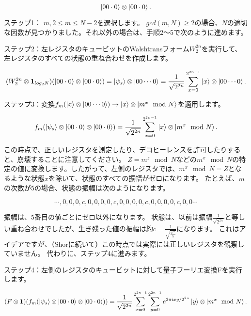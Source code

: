 \begin{equation}
\label{108}
\ket{00 \cdot 0} \otimes \ket{00 \cdot 0}.
\end{equation}

ステップ1： $m, 2 \le  m \le N-2$を選択します。 $gcd(m,N) \ge 2$の場合、$N$の適切な因数が見つかりました。それ以外の場合は、手順2〜5で次のように進めます。

ステップ2：左レジスタのキュービットのWalshtransフォーム$W_2^{2n}$を実行して、左レジスタのすべての状態の重ね合わせを作成します。

\begin{equation}
\label{109}
( W_2^{2n} \otimes \mathbf{1}_{log_2 N} )
( \ket{00 \cdot 0} \otimes \ket{00 \cdot 0} )
=
\ket{\psi_s} \otimes \ket{00 \cdots 0}
=
\frac{1}{\sqrt{2^{2n}}}
\sum_{x=0}^{2^{2n-1}}
\ket{x} \otimes \ket{00 \cdots 0}.
\end{equation}

ステップ3：変換$f_m( \ket{x} \otimes \ket{00 \cdots 0}) \to \ket{x} \otimes \ket{m^x \mod N} $を適用します。

\begin{equation}
\label{110}
f_m ( \ket{\psi_s} \otimes  \ket{00 \cdot 0} \otimes \ket{00 \cdot 0} )
=
\frac{1}{\sqrt{2^{2n}}}
\sum_{x=0}^{2^{2n-1}}
\ket{x} \otimes \ket{m^x \mod N}.
\end{equation}

この時点で、正しいレジスタを測定したり、デコヒーレンスを許可したりすると、崩壊することに注意してください。
$Z = m^z \mod N$などの$m^x \mod N$の特定の値に変換します。したがって、左側のレジスタでは、$m^x \mod N = Z$となるような状態$x$を除いて、状態のすべての振幅がゼロになります。
たとえば、$m$の次数が$5$の場合、状態の振幅は次のようになります。
  
\begin{equation}
\label{111}
\cdots ,0,0,0,c,0,0,0,0,c,0,0,0,0,c,0,0,0,0,c,0,0 \cdots
\end{equation}

振幅は、5番目の値ごとにゼロ以外になります。 状態は、以前は振幅$\frac{1}{\sqrt{2^{2n}}} $と等しい重ね合わせでしたが、生き残った値の振幅は約$c = \frac{1}{\sqrt{\frac{2^{2n}}{5}}} $になります。
これはアイデアですが、（Shorに続いて）この時点では実際には正しいレジスタを観察していません。 代わりに、ステップ4に進みます。

ステップ4：左側のレジスタのキュービットに対して量子フーリエ変換Fを実行します。

\begin{equation}
\label{112}
(F \otimes \mathbf{1} )(f_m ( \ket{\psi_s} \otimes  \ket{00 \cdot 0} \otimes \ket{00 \cdot 0} ))
=
\frac{1}{\sqrt{2^{2n}}}
\sum_{x=0}^{2^{2n-1}}
\sum_{y=0}^{2^{2n-1}}
e^{2 \pi i xy / 2^{2n}}
\ket{y} \otimes \ket{m^x \mod N}.
\end{equation}

